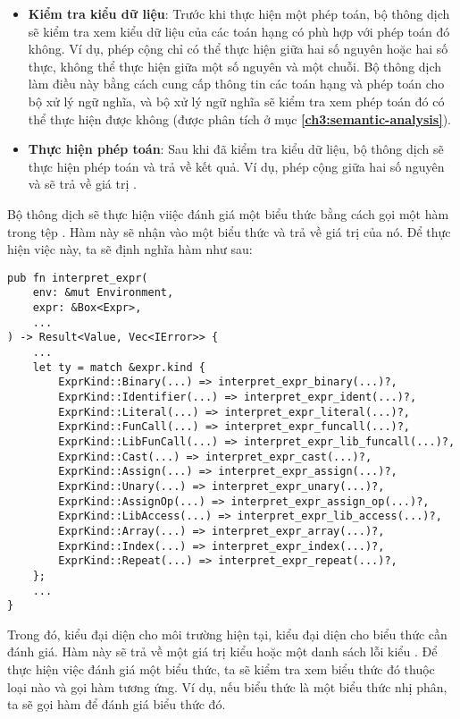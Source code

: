 \begin{itemize}
    \item \textbf{Kiểm tra kiểu dữ liệu}: Trước khi thực hiện một phép toán, bộ thông dịch sẽ kiểm tra xem kiểu dữ liệu của các toán hạng có phù hợp với phép toán đó không. Ví dụ, phép cộng chỉ có thể thực hiện giữa hai số nguyên hoặc hai số thực, không thể thực hiện giữa một số nguyên và một chuỗi. Bộ thông dịch làm điều này bằng cách cung cấp thông tin các toán hạng và phép toán cho bộ xử lý ngữ nghĩa, và bộ xử lý ngữ nghĩa sẽ kiểm tra xem phép toán đó có thể thực hiện được không (được phân tích ở mục \textbf{\ref{ch3:semantic-analysis}}).
    \item \textbf{Thực hiện phép toán}: Sau khi đã kiểm tra kiểu dữ liệu, bộ thông dịch sẽ thực hiện phép toán và trả về kết quả. Ví dụ, phép cộng giữa hai số nguyên  và  sẽ trả về giá trị .
\end{itemize}

    Bộ thông dịch sẽ thực hiện viiệc đánh giá một biểu thức bằng cách gọi một hàm  trong tệp . Hàm này sẽ nhận vào một biểu thức và trả về giá trị của nó. Để thực hiện việc này, ta sẽ định nghĩa hàm  như sau:

\begin{lstlisting}[]
pub fn interpret_expr(
    env: &mut Environment,
    expr: &Box<Expr>,
    ...
) -> Result<Value, Vec<IError>> {
    ...
    let ty = match &expr.kind {
        ExprKind::Binary(...) => interpret_expr_binary(...)?,
        ExprKind::Identifier(...) => interpret_expr_ident(...)?,
        ExprKind::Literal(...) => interpret_expr_literal(...)?,
        ExprKind::FunCall(...) => interpret_expr_funcall(...)?,
        ExprKind::LibFunCall(...) => interpret_expr_lib_funcall(...)?,
        ExprKind::Cast(...) => interpret_expr_cast(...)?,
        ExprKind::Assign(...) => interpret_expr_assign(...)?,
        ExprKind::Unary(...) => interpret_expr_unary(...)?,
        ExprKind::AssignOp(...) => interpret_expr_assign_op(...)?,
        ExprKind::LibAccess(...) => interpret_expr_lib_access(...)?,
        ExprKind::Array(...) => interpret_expr_array(...)?,
        ExprKind::Index(...) => interpret_expr_index(...)?,
        ExprKind::Repeat(...) => interpret_expr_repeat(...)?,
    };
    ...
}
\end{lstlisting}

    Trong đó,  kiểu  đại diện cho môi trường hiện tại,  kiểu  đại diện cho biểu thức cần đánh giá. Hàm này sẽ trả về một giá trị kiểu  hoặc một danh sách lỗi kiểu . Để thực hiện việc đánh giá một biểu thức, ta sẽ kiểm tra xem biểu thức đó thuộc loại nào và gọi hàm tương ứng. Ví dụ, nếu biểu thức là một biểu thức nhị phân, ta sẽ gọi hàm  để đánh giá biểu thức đó.

